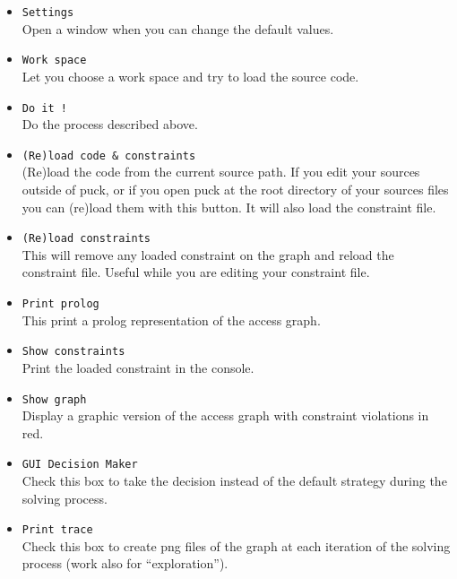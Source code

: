 \documentclass[]{article}
\begin{document}
\begin{itemize}
	\item \verb|Settings|\\
	Open a window when you can change the default values.\\
	
	\item \verb|Work space|\\
	Let you choose a work space and try to load the source code.
	
	\item \verb|Do it !|\\
	Do the process described above.
	
	\item \verb|(Re)load code & constraints|\\
	(Re)load the code from the current source path. If you edit your sources outside of puck, or if you open puck at the root directory of your sources files you can (re)load them with this button. It will also load the constraint file.
	
	\item \verb|(Re)load constraints|\\
	This will remove any loaded constraint on the graph and reload the constraint file. Useful while you are editing your constraint file.
	
	\item \verb|Print prolog|\\
	This print a prolog representation of the access graph.
	
	\item \verb|Show constraints|\\
	Print the loaded constraint in the console.
	
	\item \verb|Show graph|\\
	Display a graphic version of the access graph with constraint violations in red.
	
	\item \verb|GUI Decision Maker|\\
	Check this box to take the decision instead of the default strategy during the solving process.\\
	
	\item \verb|Print trace|\\
	Check this box to create png files of the graph at each iteration of the solving process (work also for ``exploration'').
	

\end{itemize}
\end{document}
